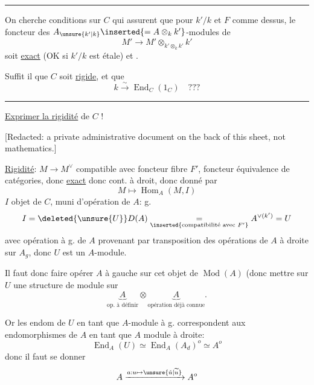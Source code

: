 
\par\noindent\rule{.85\linewidth}{.4pt}\par
On cherche conditions  sur  $C$ qui
assurent que pour 
$k'/k$ et $F$ comme dessus, le foncteur des
$A_{\unsure{k'|k}}\inserted{=A\otimes_k k'}$-modules de 
\[
M'\longrightarrow M'\otimes_{k'\otimes_k k'}k'
\]
soit \uline{exact} (OK si $k'/k$ est étale) et .

Suffit il que $C$ soit \uline{rigide}, et que
\[
k\xrightarrow{\sim}\operatorname{End}_C(1_C)\quad???
\]
\par\hspace{.3\linewidth}\rule{.25\linewidth}{.4pt}\par
\uline{Exprimer la rigidité} de $C$ !

[Redacted: a private administrative document on the back of this sheet, not mathematics.]

\uline{Rigidité}: $M\longrightarrow M^\vee$
compatible avec foncteur fibre $F'$,
foncteur équivalence de catégories, donc \uline{exact}
donc cont. à droit, 
donc donné par
\[
M\longmapsto\operatorname{Hom}_A(M,I)
\]
$I$ objet de $C$, muni d'opération de $A$: g.
\[
I=\deleted{\unsure{U}}D(A)
\underset{\inserted{\text{compatibilité avec }F'}}{=}
A^{\vee(k')}=U
\]
avec opération à g. de $A$ provenant par transposition
des opérations de $A$ à droite sur $A_g$, donc $U$ est un $A$-module.

Il faut donc faire opérer $A$ à gauche sur cet objet de
$\operatorname{Mod}(A)$ (donc mettre sur $U$ une structure de
 module sur
\[
\underbrace{A}_{\text{op. à définir}}\otimes
\underbrace{A}_{\text{opération déjà connue}}.
\]


Or les endom de $U$ en tant que $A$-module à g.
correspondent aux endomorphismes de $A$ en tant que $A$ module à droite:
\[
\operatorname{End}_A(U)\simeq
\operatorname{End}_A(A_d)^o\simeq A^o
\]
donc il faut se donner
\[
A\xrightarrow{a:u\mapsto\unsure{\check u|\widetilde u}}A^o
\]

